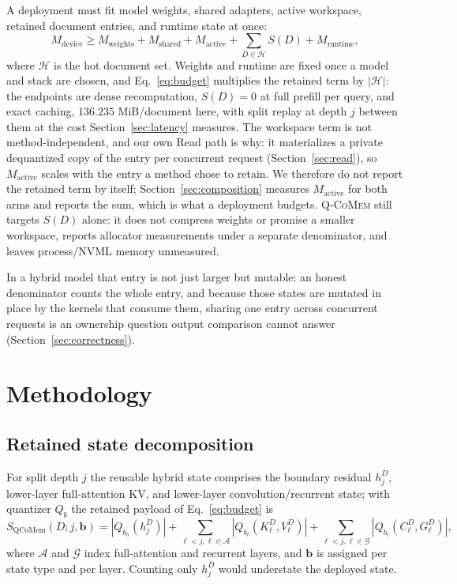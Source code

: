 \documentclass{article}
\newcommand{\qcomem}{\textsc{Q-CoMem}}
\begin{document}
A deployment must fit model weights, shared adapters, active workspace, retained
document entries, and runtime state at once:
\begin{equation}
 M_{\mathrm{device}} \geq M_{\mathrm{weights}}+M_{\mathrm{shared}}
 +M_{\mathrm{active}}+\sum_{D\in\mathcal{H}}S(D)+M_{\mathrm{runtime}},
 \label{eq:budget}
\end{equation}
where $\mathcal{H}$ is the hot document set.  Weights and runtime are fixed once
a model and stack are chosen, and Eq.~\ref{eq:budget} multiplies the retained
term by $|\mathcal{H}|$: the endpoints are dense recomputation, $S(D)=0$ at full
prefill per query, and exact caching, $136.235$ MiB/document here, with split
replay at depth $j$ between them at the cost Section~\ref{sec:latency} measures.
The workspace term is not
method-independent, and our own Read path is why: it materializes a private
dequantized copy of the entry per concurrent request (Section~\ref{sec:read}),
so $M_{\mathrm{active}}$ scales with the entry a method chose to retain.  We
therefore do not report the retained term by itself;
Section~\ref{sec:composition} measures $M_{\mathrm{active}}$ for both arms and
reports the sum, which is what a deployment budgets.  \qcomem{} still targets
$S(D)$ alone: it does not compress weights or promise a smaller workspace,
reports allocator measurements under a separate denominator, and leaves
process/NVML memory unmeasured.

In a hybrid model that entry is not just larger but mutable: an honest
denominator counts the whole entry, and because those states are mutated in
place by the kernels that consume them, sharing one entry across concurrent
requests is an ownership question output comparison cannot answer
(Section~\ref{sec:correctness}).

\section{Methodology}
\label{sec:method}

\subsection{Retained state decomposition}
\label{sec:decomposition}

For split depth $j$ the reusable hybrid state comprises the boundary residual
$h_j^D$, lower-layer full-attention KV, and lower-layer convolution/recurrent
state; with quantizer $Q_b$ the retained payload of Eq.~\ref{eq:budget} is
\begin{equation}
 S_{\mathrm{QCoMem}}(D;j,\mathbf b)=|Q_{b_h}(h_j^D)|+
 \sum_{\ell<j,\ell\in\mathcal A}|Q_{b_\ell}(K^D_\ell,V^D_\ell)|+
 \sum_{\ell<j,\ell\in\mathcal G}|Q_{b_\ell}(C^D_\ell,G^D_\ell)|,
\end{equation}
where $\mathcal A$ and $\mathcal G$ index full-attention and recurrent layers, and
$\mathbf b$ is assigned per state type and per layer.  Counting only $h_j^D$
would understate the deployed state.
\end{document}
